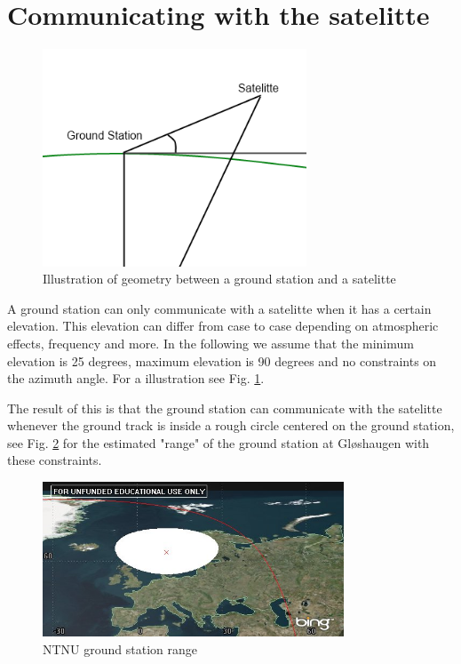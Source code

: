 \section{Communicating with the satelitte}

\begin{figure}
	\begin{center}
		\includegraphics[width=0.7\textwidth]{Figures/groundstation_satelitte_geometry}
	\end{center}
\caption[Ground station satellite geometry]{Illustration of geometry between a ground station and a satelitte}
\label{fig:gs_s_geom}
\end{figure}

A ground station can only communicate with a satelitte when it has a certain elevation. This elevation can differ from case to case depending on atmospheric effects, frequency and more. 
In the following we assume that the minimum elevation is 25 degrees, maximum elevation is 90 degrees and no constraints on the azimuth angle.  For a illustration see Fig. \ref{fig:gs_s_geom}.


The result of this is that the ground station can communicate with the satelitte whenever the ground track is inside a rough circle centered on the ground station, see Fig. \ref{fig:ntnu_range} for the estimated "range" of the ground station at Gløshaugen with these constraints.

\begin{figure}
	\begin{center}
		\includegraphics[width=0.8\textwidth]{Figures/ntnu_footprint}
	\end{center}
\caption[ntnu footprint]{NTNU ground station range}
\label{fig:ntnu_range}
\end{figure}